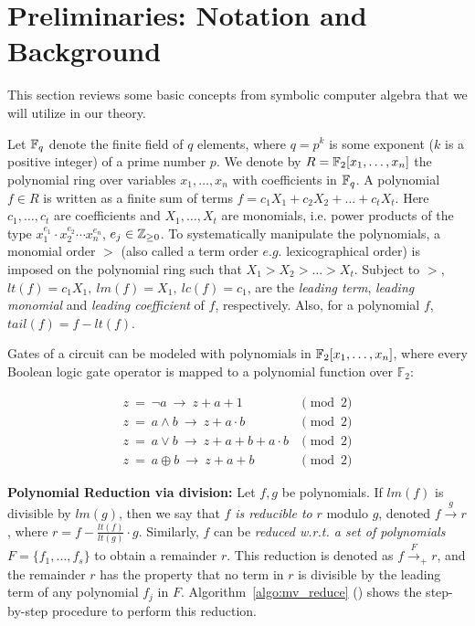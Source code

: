 \section{Preliminaries: Notation and Background}
\label{sec:prelim}
This section reviews some basic concepts from symbolic computer
algebra that we will utilize in our theory. 
\par Let ${\mathbb{F}}_q$ denote the finite field of $q$ elements, where $q=p^k$ is some 
exponent ($k$ is a positive integer) of a prime number $p$. We
denote by $R = {\mathbb{F}}_2[x_1, \dots, x_n]$
the  polynomial ring over variables $x_1, \dots, x_n$ with
coefficients in ${\mathbb{F}}_q$. A polynomial $f \in R$ is written as a finite sum of terms 
$f = c_1 X_1 +  c_2 X_2 + \dots + c_t X_t$.  Here $c_1, \dots, c_t$
are coefficients and $X_1, \dots, X_t$ are monomials, i.e. power
products of the type $x_1^{e_{1}}\cdot x_2^{e_{2}}\cdots x_n^{e_{n}}$, 
$e_j \in {\mathbb{Z}}_{\geq  0}$. To systematically manipulate the
polynomials, a monomial order $>$ (also called a term order $e.g.$ lexicographical 
order) is
imposed on the polynomial ring such that  $X_1 >X_2 > \dots >  X_t$.  Subject to
$>$, $lt(f) = c_1 X_1, ~lm(f) = X_1, ~lc(f) = c_1$, are the {\it
leading   term}, {\it   leading monomial} and {\it   leading
coefficient} of $f$, respectively. Also, for a polynomial $f$,
$tail(f) = f - lt(f)$.

\par Gates of a circuit can be modeled with polynomials in ${\mathbb{F}}_2[x_1,\dots,x_n]$, 
where every Boolean logic gate operator is mapped to a polynomial
function over ${\mathbb{F}}_2$: 

\begin{equation}
\label{bool2poly}
\begin{split}
z ~ =  ~ \neg a ~ \rightarrow ~ z+a+1 & \pmod 2  \\
z ~ =  ~ a \wedge b ~ \rightarrow ~ z+a \cdot b & \pmod 2\\
z ~ =  ~ a \vee b ~ \rightarrow ~ z+a+b+a \cdot b & \pmod 2 \\
z ~ =  ~ a \oplus b ~ \rightarrow ~ z+a+b & \pmod 2 
\end{split}
\end{equation}

\par {\bf Polynomial Reduction via division:} Let $f, g$ be polynomials. If $lm(f)$ is divisible by
$lm(g)$, then we say that $f$ {\it is reducible to} $r$ modulo $g$,
denoted $f \stackrel{g}{\textstyle\longrightarrow} r$, where $r = f - {\frac{lt(f)}{lt(g)}} \cdot g$. Similarly, $f$ can be {\it reduced 
w.r.t. a set of polynomials}  $F = \{f_1, \dots, f_s\}$ to obtain a
remainder $r$. This reduction is denoted as $f \stackrel{F} {\textstyle
  \longrightarrow}_+ r$, and the remainder $r$ has the property that
no term in $r$ is divisible by the leading term of any polynomial
$f_j$ in $F$. Algorithm~\ref{algo:mv_reduce} (\cite{gb_book}) shows the 
step-by-step procedure to perform this reduction.  

